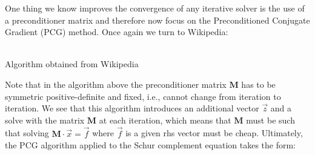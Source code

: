 One thing we know improves the convergence of any iterative solver is the use of a 
preconditioner matrix and therefore now focus on the Preconditioned Conjugate Gradient (PCG) method.
Once again we turn to Wikipedia:
\begin{center}
\\
{\captionfont Algorithm obtained from Wikipedia}
\end{center}

Note that in the algorithm above the preconditioner matrix ${\bm M}$ 
has to be symmetric positive-definite and fixed, i.e., cannot change from iteration to iteration. 
We see that this algorithm introduces an additional vector $\vec{z}$ and a solve with the 
matrix ${\bm M}$ at each iteration, which means that ${\bm M}$ must be such that solving ${\bm M}\cdot \vec{x}= \vec{f}$ 
where $\vec{f}$ is a given rhs vector must be cheap. Ultimately, the PCG algorithm applied to 
the Schur complement equation takes the form:

